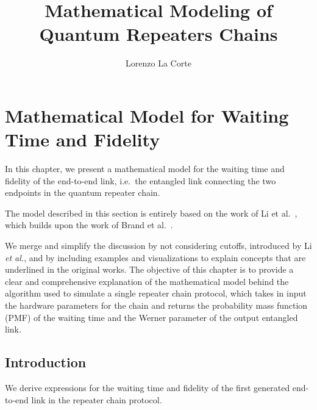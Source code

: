 \documentclass{masterthesis}
\begin{document}
\title{Mathematical Modeling of Quantum Repeaters Chains}

\author{Lorenzo La Corte}

\advisor{}

\examiner{}

\maketitle

\tableofcontents


\chapter{Mathematical Model for Waiting Time and Fidelity}

In this chapter, we present a mathematical model for the waiting time and fidelity of the end-to-end link, i.e.\ the entangled link connecting the two endpoints in the quantum repeater chain.

The model described in this section is entirely based on the work of Li et al.~\cite{Li_2021}, which builds upon the work of Brand et al.~\cite{Brand_2020}.

We merge and simplify the discussion by not considering cutoffs, introduced by Li \textit{et al.}, and by including examples and visualizations to explain concepts that are underlined in the original works.
The objective of this chapter is to provide a clear and comprehensive explanation of the mathematical model behind the algorithm used to simulate a single repeater chain protocol, which takes in input the hardware parameters for the chain and returns the probability mass function (PMF) of the waiting time and the Werner parameter of the output entangled link.


\section{Introduction}

We derive expressions for the waiting time and fidelity of the first generated end-to-end link in the repeater chain protocol. 
\end{document}
